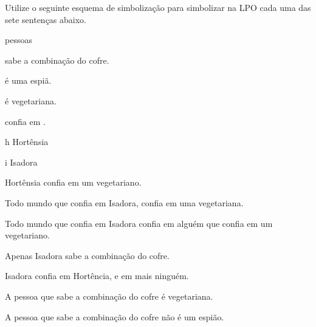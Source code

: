 \problempart
Utilize o seguinte esquema de simbolização para simbolizar na LPO cada uma das sete sentenças abaixo.
\begin{center}
\begin{ekey}
\item[\text{domínio}] pessoas
\item[\atom{S}{x}]  sabe a combinação do cofre.
\item[\atom{E}{x}]  é uma espiã.
\item[\atom{V}{x}]  é vegetariana.
\item[\atom{C}{x,y}]  confia em .
\item[h] Hortênsia
\item[i] Isadora
\end{ekey}
\end{center}
\begin{earg}
\item Hortênsia confia em um vegetariano.
\item Todo mundo que confia em Isadora, confia em uma vegetariana.
\item Todo mundo que confia em Isadora confia em alguém que confia em um vegetariano.
\item Apenas Isadora sabe a combinação do cofre.
\item Isadora confia em Hortência, e em mais ninguém.
\item A pessoa que sabe a combinação do cofre é vegetariana.
\item A pessoa que sabe a combinação do cofre não é um espião.
\end{earg}


